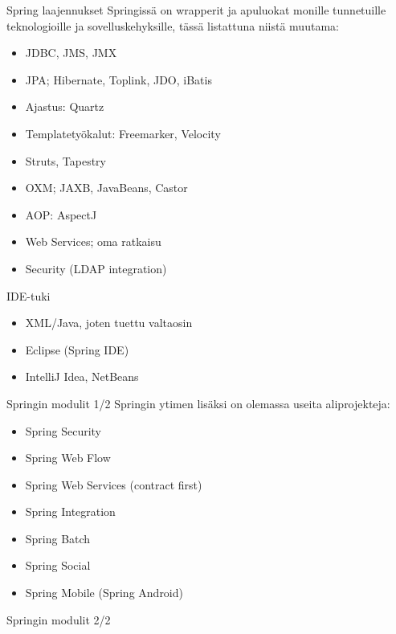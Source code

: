 \documentclass[hyperref={pdfauthor=\AUTHOR},14pt]{beamer}
\begin{document}
\begin{frame}{Spring laajennukset}
Springissä on wrapperit ja apuluokat monille tunnetuille
teknologioille ja sovelluskehyksille, tässä listattuna niistä muutama:
\begin{itemize}
\item JDBC, JMS, JMX
\item JPA; Hibernate, Toplink, JDO, iBatis
\item Ajastus: Quartz
\item Templatetyökalut: Freemarker, Velocity
\item Struts, Tapestry
\item OXM; JAXB, JavaBeans, Castor 
\item AOP: AspectJ
\item Web Services; oma ratkaisu
\item Security (LDAP integration)
\end{itemize}
\end{frame}

\begin{frame}{IDE-tuki}
\begin{itemize}
\item XML/Java, joten tuettu valtaosin
\item Eclipse (Spring IDE)
\item IntelliJ Idea, NetBeans
\end{itemize}
\end{frame}


\begin{frame}{Springin modulit 1/2}
Springin ytimen lisäksi on olemassa useita aliprojekteja:
\begin{itemize}
\item Spring Security
\item Spring Web Flow
\item Spring Web Services (contract first)
\item Spring Integration 
\item Spring Batch
\item Spring Social
\item Spring Mobile (Spring Android)
\end{itemize}
\end{frame}

\begin{frame}{Springin modulit 2/2}
\end{frame}



\end{document}
